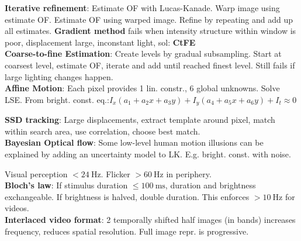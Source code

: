 \textbf{Iterative refinement}:
Estimate OF with Lucas-Kanade. Warp image using estimate OF. Estimate OF using warped image. Refine by repeating and add up all estimates. \textbf{Gradient method} fails when intensity structure within window is poor, displacement large, inconstant light, sol: \textbf{CtFE}\\
\textbf{Coarse-to-fine Estimation}:
Create levels by gradual subsampling. Start at coarsest level, estimate OF, iterate and add until reached finest level. Still fails if large lighting changes happen.\\
\textbf{Affine Motion}: Each pixel provides 1 lin. constr., 6 global unknowns. Solve LSE. From bright. const. eq.:$I_x\left(a_1+a_2 x+a_3 y\right)+I_y\left(a_4+a_5 x+a_6 y\right)+I_t \approx 0$



\textbf{SSD tracking}: Large displacements, extract template around pixel, match within search area, use correlation, choose best match.\\
\textbf{Bayesian Optical flow}: Some low-level human motion illusions can be explained by adding an uncertainty model to LK. E.g. bright. const. with noise.


Visual perception $<24 \mathrm{~Hz}$. Flicker $>60 \mathrm{~Hz}$ in periphery.\\
\textbf{Bloch's law}: If stimulus duration $\leq 100 \mathrm{~ms}$, duration and brightness exchangeable. If brightness is halved, double duration. This enforces $>10 \mathrm{~Hz}$ for videos.\\
\textbf{Interlaced video format}: 2 temporally shifted half images (in bands) increases frequency, reduces spatial resolution. Full image repr. is progressive.




